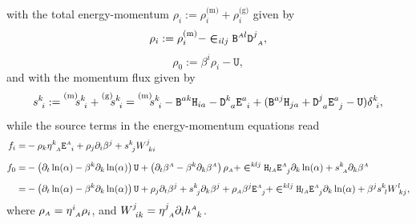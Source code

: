 \documentclass[
10pt, %
a4paper, %
oneside, %
headinclude,footinclude, %
BCOR5mm, %
]{scrartcl}
\newcommand{\sA}{\mathsmaller A}
\newcommand{\pd}[1]{\partial_{#1}}
\newcommand{\tetrsymbol}{h}
\newcommand{\itetrsymbol}{\eta}
\newcommand{\itetr}[2]{\itetrsymbol^{#1}_{\phantom{#1}#2}}
\newcommand{\tetr}[2]{\tetrsymbol^{#1}_{\phantom{#1}#2}}
\newcommand{\stress}[2]{s_{\ #1}^{#2}}
\newcommand{\Dfin}[2]{\mathtt{D}_{\phantom{#2}#1}^{#2}}	%
\newcommand{\Hfin}[2]{\mathtt{H}_{#2#1}}	%
\newcommand{\Efin}[2]{\mathtt{E}^{#1}_{\phantom{#1}#2}}	%
\newcommand{\Ufin}{\mathtt{U}}
\newcommand{\Bfin}[2]{\mathtt{B}^{#1#2}}	%
\newcommand{\w}[2]{W^{#1}_{\phantom{#1}#2}}
\newcommand{\LCsymb}{\bm{\in}}    %
\newcommand{\rhs}[1]{f_{#1}}
\newcommand{\mat}[1]{\prescript{\text{(m)}}{}{\hspace{-0.1cm}#1}}
\newcommand{\gra}[1]{\prescript{\text{(g)}}{}{\hspace{-0.1cm}#1}}
\newcommand{\shift}[1]{\beta^{#1}}
\begin{document}
with the total energy-momentum $ \rho_i := \rho^\text{(m)}_i + \rho^\text{(g)}_i $ given by
\begin{equation*}
	\rho_i := \rho^\text{(m)}_i  -\LCsymb_{ilj} 
	\Bfin{\sA}{l}\Dfin{\sA}{j},
\end{equation*}
	\begin{equation*}
	\rho_0 := \beta^i \rho_i - \Ufin,
\end{equation*}
and with the momentum flux given by
\begin{gather*}
	\stress{i}{k} := \mat{\stress{i}{k}} + \gra{\stress{i}{k}} = \mat{\stress{i}{k}} -\Bfin{a}{k} 
	\Hfin{a}{i} - 
	\Dfin{a}{k} \Efin{a}{i} + (\Bfin{a}{j} 
	\Hfin{a}{j} + 
	\Dfin{a}{j} \Efin{a}{j} 
	- \Ufin)\delta^k_{\ i},
\end{gather*}
while the source terms in the energy-momentum equations read
\begin{align*}
	\rhs{i} =&-\rho_k \itetr{k}{\sA} \Efin{\sA}{i} + \rho_j \pd{i}\shift{j}
	+\stress{j}{k} \w{j}{ki}\\[2mm]
	\rhs{0} =&
	- \left(\pd{t} \ln(\alpha) - \shift{k} \pd{k}\ln(\alpha) \right) \Ufin
	+ \left( \pd{t} \shift{\sA} - \shift{k} \pd{k}\shift{\sA} \right) \rho_{\sA}
	+ \LCsymb^{klj} \Hfin{\sA}{l}\Efin{\sA}{j}\pd{k}\ln(\alpha) + \stress{\sA}{k} 
	\pd{k}\shift{\sA}\\[2mm]
	=&
	- \left(\pd{t} \ln(\alpha) - \shift{k} \pd{k}\ln(\alpha) \right) \Ufin
	+ \rho_j \pd{t} \shift{j} + \stress{j}{k} \pd{k}\shift{j} + \rho_{\sA} \shift{j} \Efin{\sA}{j} 
	+ \LCsymb^{klj} \Hfin{\sA}{l}\Efin{\sA}{j}\pd{k}\ln(\alpha) + \shift{j} \stress{l}{k} \w{l}{kj},
\end{align*}
where $ \rho_{\sA} = \itetr{i}{\sA} \rho_i$, 
and $ 
\w{j}{ik} = \itetr{j}{\sA}\pd{i}\tetr{\sA}{k}$.
\end{document}
